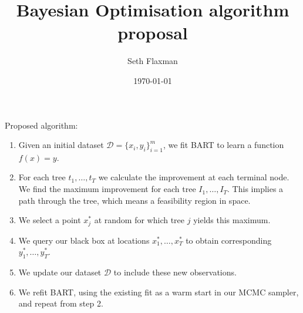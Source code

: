 \documentclass[12pt]{article}
\title{Bayesian Optimisation algorithm proposal}
\date{\today}
\author{Seth Flaxman}
\begin{document}
\maketitle 
Proposed algorithm:

\begin{enumerate}
\item Given an initial dataset $\mathcal{D} = \{x_i,y_i\}_{i=1}^m$, we fit BART to learn a function $f(x) = y$.
\item For each tree $t_1, \ldots, t_T$ we calculate the improvement at each terminal node. We find the maximum improvement 
for each tree $I_1, \ldots, I_T$. This implies a path through the tree, which means a feasibility region in space.
\item We select a point $x_j^*$ at random for which tree $j$ yields this maximum. 
\item We query our black box at locations $x_1^*, \ldots, x_T^*$ to obtain corresponding $y_1^*, \ldots, y_T^*$.
\item We update our dataset $\mathcal{D}$ to include these new observations.
\item We refit BART, using the existing fit as a warm start in our MCMC sampler, and repeat from step 2.
\end{enumerate}
\end{document}
